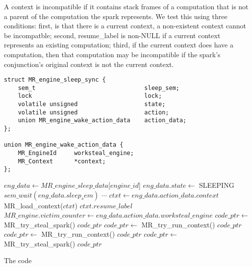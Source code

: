 A context is incompatible if it contains stack frames of a computation that
is not a parent of the computation the spark represents.
We test this using three conditions:
first, is that there is a current context, a non-existent context cannot
be incompatble;
second, resume\_label is non-NULL if a current context represents an
existing computation;
third, if the current context does have a computation, then that computation
may be incompatible if the spark's conjunction's original context is not the
current context.

\begin{algorithm}[tbp]
\begin{minipage}{\textwidth}
\begin{verbatim}
struct MR_engine_sleep_sync {
    sem_t                               sleep_sem;
    lock                                lock;
    volatile unsigned                   state;
    volatile unsigned                   action;
    union MR_engine_wake_action_data    action_data;
};

union MR_engine_wake_action_data {
    MR_EngineId     worksteal_engine;
    MR_Context      *context;
};
\end{verbatim}

\begin{algorithmic}
        \Loop
            \State $eng\_data \gets MR\_engine\_sleep\_data$[$engine\_id$]
            \State $eng\_data.state \gets$ SLEEPING
            \State $sem\_wait(eng\_data.sleep_sem)$
                \State $\cdots$
              \EndCase
                \State $ctxt \gets eng\_data.action\_data.context$
                \State MR\_load\_context($ctxt$)
                \Goto $ctxt.resume\_label$
              \EndCase
                \State $MR\_engine.victim\_counter \gets
                    eng\_data.action\_data.worksteal\_engine$
                \State $code\_ptr \gets$ MR\_try\_steal\_spark()
                    \Goto $code\_ptr$
                \EndIf
                \State $code\_ptr \gets$ MR\_try\_run\_context()
                    \Goto $code\_ptr$
                \EndIf
                \State \Break
              \EndCase
                \State $code\_ptr \gets$ MR\_try\_run\_context()
                    \Goto $code\_ptr$
                \EndIf
                \State $code\_ptr \gets$ MR\_try\_steal\_spark()
                    \Goto $code\_ptr$
                \EndIf
                \State \Break
              \EndCase
            \EndSwitch
        \EndLoop
    \EndProcedure
\end{algorithmic}

\end{minipage}
\caption{The \sleep code}
\end{algorithm}

